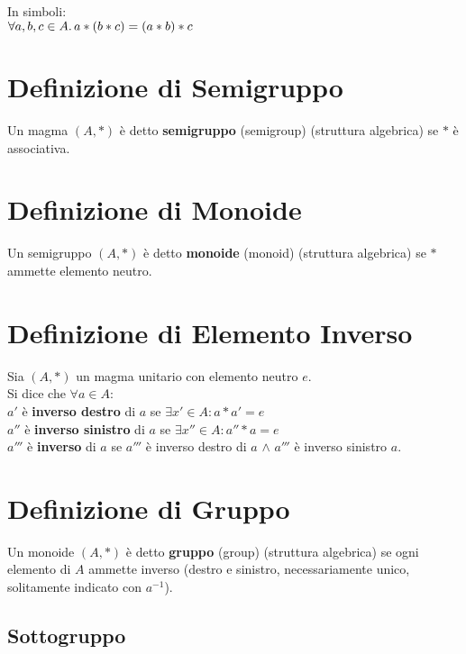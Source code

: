 \documentclass[a4paper, twoside, italian, 11pt]{book}
\begin{document}
\noindent
In simboli: \\

$\forall a,b,c \in A \ldotp a * (b * c) = (a * b) * c$



\section{Definizione di Semigruppo}

Un magma $(A, *)$ è detto \textbf{semigruppo} (semigroup) (struttura algebrica) se $*$ è associativa.



\section{Definizione di Monoide}

Un semigruppo $(A, *)$ è detto \textbf{monoide} (monoid) (struttura algebrica) se $*$ ammette elemento neutro.



\section{Definizione di Elemento Inverso}

Sia $(A, *)$ un magma unitario con elemento neutro $e$. \\
Si dice che $\forall a \in A$: \\

$a'$ è \textbf{inverso destro} di $a$ se $\exists x' \in A : a * a' = e$ \\
\indent
$a''$ è \textbf{inverso sinistro} di $a$ se $\exists x'' \in A : a'' * a = e$ \\
\indent
$a'''$ è \textbf{inverso} di $a$ se $a'''$ è inverso destro di $a$ $\land$ $a'''$ è inverso sinistro $a$.



\section{Definizione di Gruppo}

Un monoide $(A, *)$ è detto \textbf{gruppo} (group) (struttura algebrica) se ogni elemento di $A$ ammette inverso (destro e sinistro, necessariamente unico, solitamente indicato con $a^{-1}$).


\subsection{Sottogruppo}
\end{document}
